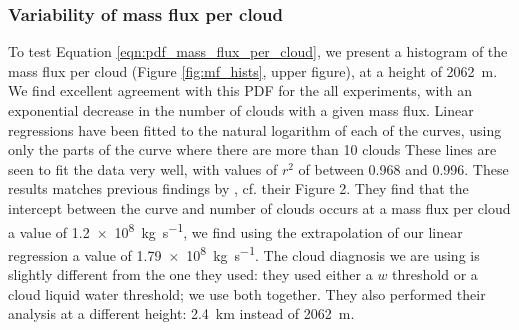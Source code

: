 \documentclass[11pt,a4paper]{article}
\begin{document}
%
\subsubsection{Variability of mass flux per cloud}
To test Equation \ref{eqn:pdf_mass_flux_per_cloud}, we present a histogram of the mass flux per cloud (Figure \ref{fig:mf_hists}, upper figure), at a height of \SI{2062}{m}. We find excellent agreement with this PDF for the all experiments, with an exponential decrease in the number of clouds with a given mass flux. Linear regressions have been fitted to the natural logarithm of each of the curves, using only the parts of the curve where there are more than 10 clouds These lines are seen to fit the data very well, with values of $r^2$ of between \SI{0.968}{} and \SI{0.996}{}. These results matches previous findings by \cite{CC2006II}, cf. their Figure 2. They find that the intercept between the curve and number of clouds occurs at a mass flux per cloud a value of \SI{1.2e8}{kg.s^{-1}}, we find using the extrapolation of our linear regression a value of \SI{1.79e8}{kg.s^{-1}}. The cloud diagnosis we are using is slightly different from the one they used: they used either a $w$ threshold or a cloud liquid water threshold; we use both together. They also performed their analysis at a different height: \SI{2.4}{km} instead of \SI{2062}{m}. 
\end{document}
